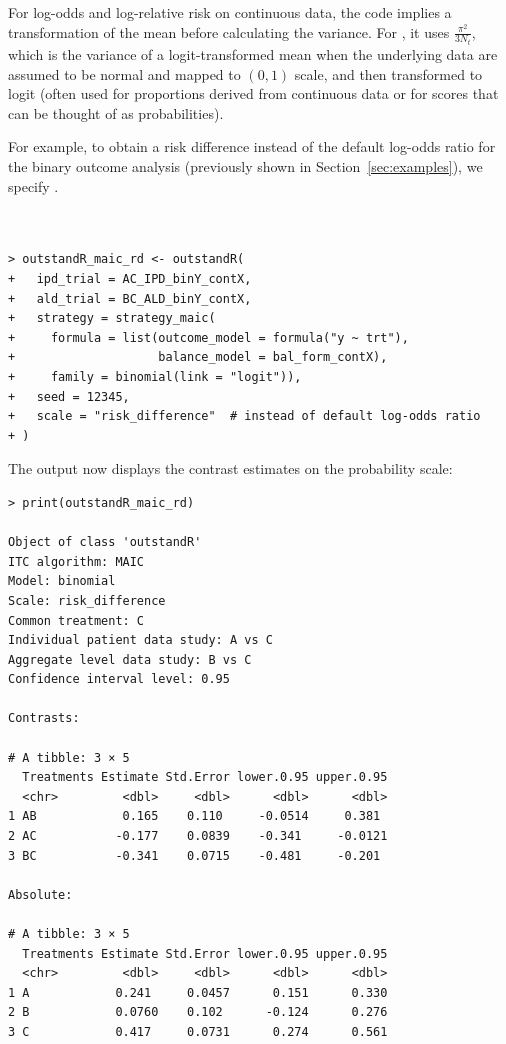 \documentclass[article]{jss}
\begin{document}
For log-odds and log-relative risk on continuous data, the  code implies a transformation of the mean before calculating the variance. For , it uses $\frac{\pi^2}{3 N_t}$, which is the variance of a logit-transformed mean when the underlying data are assumed to be normal and mapped to $(0,1)$ scale, and then transformed to logit (often used for proportions derived from continuous data or for scores that can be thought of as probabilities).


For example, to obtain a risk difference instead of the default log-odds ratio for the binary outcome analysis (previously shown in Section~\ref{sec:examples}), we specify .\\
\\
\begin{minipage}{\linewidth}
\begin{verbatim}

> outstandR_maic_rd <- outstandR(
+   ipd_trial = AC_IPD_binY_contX, 
+   ald_trial = BC_ALD_binY_contX,
+   strategy = strategy_maic(
+     formula = list(outcome_model = formula("y ~ trt"),
+                    balance_model = bal_form_contX),
+     family = binomial(link = "logit")),
+   seed = 12345,
+   scale = "risk_difference"  # instead of default log-odds ratio
+ )

\end{verbatim}
\end{minipage}

The output now displays the contrast estimates on the probability scale:

\begin{verbatim}
> print(outstandR_maic_rd)

Object of class 'outstandR' 
ITC algorithm: MAIC 
Model: binomial 
Scale: risk_difference 
Common treatment: C 
Individual patient data study: A vs C 
Aggregate level data study: B vs C 
Confidence interval level: 0.95 

Contrasts:

# A tibble: 3 × 5
  Treatments Estimate Std.Error lower.0.95 upper.0.95
  <chr>         <dbl>     <dbl>      <dbl>      <dbl>
1 AB            0.165    0.110     -0.0514     0.381 
2 AC           -0.177    0.0839    -0.341     -0.0121
3 BC           -0.341    0.0715    -0.481     -0.201 

Absolute:

# A tibble: 3 × 5
  Treatments Estimate Std.Error lower.0.95 upper.0.95
  <chr>         <dbl>     <dbl>      <dbl>      <dbl>
1 A            0.241     0.0457      0.151      0.330
2 B            0.0760    0.102      -0.124      0.276
3 C            0.417     0.0731      0.274      0.561
\end{verbatim}
\end{document}

